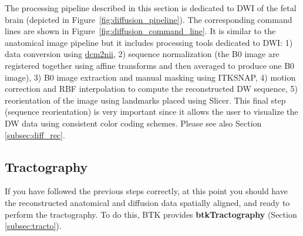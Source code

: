 The processing pipeline described in this section is dedicated to DWI of the fetal brain (depicted in Figure~\ref{fig:diffusion_pipeline}). The corresponding command lines are shown in Figure~\ref{fig:diffusion_command_line}. It is similar to the anatomical image pipeline but it includes processing tools dedicated to DWI: 1) data conversion using \href{http://www.cabiatl.com/mricro/mricron/dcm2nii.html}{dcm2nii}, 2) sequence normalization (the B0 image are registered together using affine transforms and then averaged to produce one B0 image), 3) B0 image extraction and manual masking using ITKSNAP, 4) motion correction and RBF interpolation to compute the reconstructed DW sequence, 5) reorientation of the image using landmarks placed using Slicer. This final step (sequence reorientation) is very important since it allows the user to visualize the DW data using consistent color coding schemes. Please see also Section \ref{subsec:diff_rec}. 

  \begin{figure*}[!h]
   \caption{Overview of the processing pipeline for diffusion data in BTK. dcm2nii is used to convert the DICOM data to NIFTI format and Slicer for the placement of landmarks on which is based the reorientation of the 3D reconstructed image. \href{htpp://www.itksnap.org}{ITKSNAP} is used to create a rough mask of the brain.}
   \label{fig:diffusion_pipeline}
 \end{figure*}

  \begin{figure*}[!h]
   \caption{Command lines corresponding to the processing pipeline for diffusion data in BTK. On the left are shown the blocks used in the anatomical data pipeline (Figure~\ref{fig:diffusion_pipeline}) and on the right the correspond command lines.}
   \label{fig:diffusion_command_line}
 \end{figure*}

\subsection{Tractography}
If you have followed the previous steps correctly, at this point you should
have the reconstructed anatomical and diffusion data spatially aligned, and
ready to perform the tractography. To do this, BTK provides
\textbf{btkTractography} (Section \ref{subsec:tracto}).
